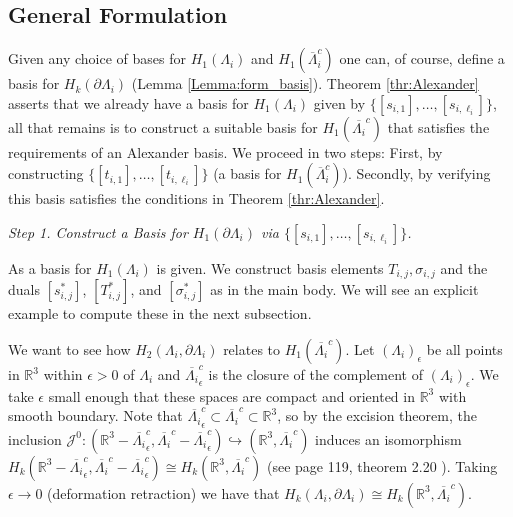 \documentclass[11pt]{article}
\theoremstyle{plain}
\theoremstyle{definition}
\theoremstyle{remark}
\newcommand{\R}{\mathbb{R}}
\newcommand{\ST}{\Lambda}
\begin{document}
\subsection{General Formulation}\label{append:general_formulation}



Given any choice of bases for \(H_1(\ST_i)\) and \(H_1 (\overline{\ST}^c_i )\) one can, of course, define a basis for \(H_k (\partial \ST_i)\) (Lemma \ref{Lemma:form_basis}). Theorem \ref{thr:Alexander} asserts that we already have a basis for \(H_1(\ST_i)\) given by \(\{ [s_{i,1}], \dots, [s_{i,{\ell_i}}] \}\), all that remains is to construct a suitable basis for \(H_1(\overline{\ST_i}^c)\) that satisfies the requirements of an Alexander basis. We proceed in two steps: First, by constructing \(\{[t_{i,1}], \dots, [t_{i,\ell_i}]\}\) (a basis for \(H_1 (\overline{\ST}^c_i )\)). Secondly, by verifying this basis satisfies the conditions in Theorem \ref{thr:Alexander}. 




\bigskip 

\textit{Step 1. Construct a Basis for \(H_1(\partial \ST_i)\) via \(\{[s_{i,1}], \dots, [s_{i,{\ell_i}}] \}\).}


As a basis for \(H_1(\ST_i)\) is given. We construct basis elements \(T_{i,j}, \sigma_{i,j}\) and the duals \([s_{i,j}^*]\), \([T_{i,j}^*]\), and \([\sigma_{i,j}^*]\) as in the main body. We will see an explicit example to compute these in the next subsection. 

We want to see how \(H_2(\ST_i , \partial \ST_i)\) relates to \(H_1(\overline{\ST_i}^c)\). Let \((\ST_i)_\epsilon\) be all points in \(\R^3\) within \(\epsilon >0\) of \(\ST_i\) and \(\overline{\ST_i}^c_\epsilon\) is the closure of the complement of \((\ST_i)_\epsilon\). We take \(\epsilon\) small enough that these spaces are compact and oriented in \(\R^3\) with smooth boundary. Note that \(\overline{\ST_i}^c_\epsilon \subset \overline{\ST_i}^c \subset \R^3\), so by the excision theorem, the inclusion \(\mathcal{J}^0 : ( \R^3 - \overline{\ST_i}^c_\epsilon, \overline{\ST_i}^c - \overline{\ST_i}^c_\epsilon) \hookrightarrow (\R^3, \overline{\ST_i}^c)\) induces an isomorphism \(H_k (\R^3 - \overline{\ST_i}^c_\epsilon, \overline{\ST_i}^c - \overline{\ST_i}^c_\epsilon) \cong H_k (\R^3 , \overline{\ST_i}^c) \) (see page 119, theorem 2.20 \cite{hatcher2005algebraic}). Taking \(\epsilon \to 0\) (deformation retraction) we have that \(H_k (\ST_i, \partial \ST_i) \cong H_k (\R^3 , \overline{\ST_i}^c) \).
\end{document}
